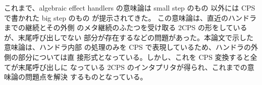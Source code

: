 これまで、algebraic effect handlers の意味論は small step のもの
\cite{10.1145/2500365.2500590, PRETNAR201519}
以外には
CPS で書かれた big step のもの
\cite{e6cb0c3222794e48bf38cf44e46fe4aa}
が提示されてきた。
この意味論は、直近のハンドラまでの継続とその外側
のメタ継続のふたつを受け取る 2CPS の形をしているが、末尾呼び出しでない
部分が存在するなどの問題があった。本論文で示した意味論は、ハンドラ内部
の処理のみを CPS で表現しているため、ハンドラの外側の部分については直
接形式となっている。しかし、これを CPS 変換すると全てが末尾呼び出しに
なっている 2CPS のインタプリタが得られ、これまでの意味論の問題点を解決
するものとなっている。
